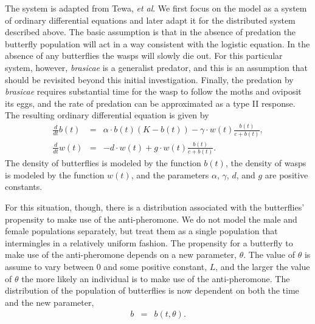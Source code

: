 \documentclass[12pt]{article}
\begin{document}
The system is adapted from Tewa, \textit{et al}\cite{TEWA20134825}. We
first focus on the model as a system of ordinary differential
equations and later adapt it for the distributed system described
above. The basic assumption is that in the absence of predation the
butterfly population will act in a way consistent with the logistic
equation. In the absence of any butterflies the wasps will slowly die
out. For this particular system, however, \textit{brasicae} is a
generalist predator, and this is an assumption that should be
revisited beyond this initial investigation. Finally, the predation by
\textit{brasicae} requires substantial time for the wasp to follow the
moths and oviposit its eggs, and the rate of predation can be
approximated as a type II response\cite{TEWA20134825}.  The resulting
ordinary differential equation is given by
\begin{eqnarray}
  \label{eq:initialSystem1}
  \frac{d}{dt} b(t) & = & \alpha \cdot b(t) (K - b(t)) - \gamma \cdot w(t) \frac{b(t)}{c+b(t)}, \\
  \label{eq:initialSystem2}
  \frac{d}{dt} w(t) & = & -d \cdot w(t) + g \cdot w(t) \frac{b(t)}{c+b(t)}.
\end{eqnarray}
The density of butterflies is modeled by the function $b(t)$, the
density of wasps is modeled by the function $w(t)$, and the parameters
$\alpha$, $\gamma$, $d$, and $g$ are positive constants. 

For this situation, though, there is a distribution associated with
the butterflies' propensity to make use of the anti-pheromone. We do
not model the male and female populations separately, but treat them
as a single population that intermingles in a relatively uniform
fashion. The propensity for a butterfly to make use of the
anti-pheromone depends on a new parameter, $\theta$. The value of
$\theta$ is assume to vary between $0$ and some positive constant,
$L$, and the larger the value of $\theta$ the more likely an
individual is to make use of the anti-pheromone. The distribution of
the population of butterflies is now dependent on both the time and
the new parameter,
\begin{eqnarray}
  b & = & b(t,\theta).
\end{eqnarray}
\end{document}
